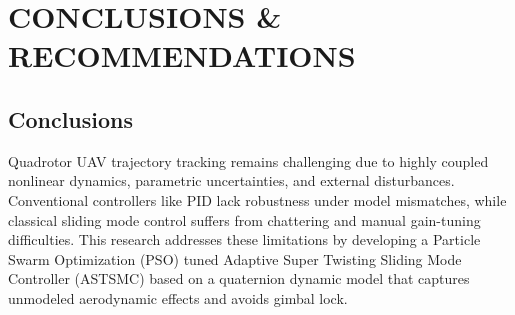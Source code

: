 				\chapter{CONCLUSIONS \& RECOMMENDATIONS}
  


\section{Conclusions}	
Quadrotor UAV trajectory tracking remains challenging due to highly coupled nonlinear dynamics, parametric uncertainties, and external disturbances. Conventional controllers like PID lack robustness under model mismatches, while classical sliding mode control suffers from chattering and manual gain-tuning difficulties. This research addresses these limitations by developing a Particle Swarm Optimization (PSO) tuned Adaptive Super Twisting Sliding Mode Controller (ASTSMC) based on a quaternion dynamic model that captures unmodeled aerodynamic effects and avoids gimbal lock.

